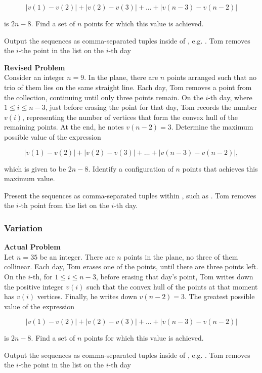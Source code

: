 $$|v(1) - v(2)| + |v(2) - v(3)| + ... + |v(n-3) - v(n-2)|$$

is $2n-8$. Find a set of $n$ points for which this value is achieved.

Output the sequences as comma-separated tuples inside of \boxed, e.g. . Tom removes the $i$-the point in the list on the $i$-th day

\textbf{Revised Problem}\\
Consider an integer $n = 9$. In the plane, there are $n$ points arranged such that no trio of them lies on the same straight line. Each day, Tom removes a point from the collection, continuing until only three points remain. On the $i$-th day, where $1 \leq i \leq n - 3$, just before erasing the point for that day, Tom records the number $v(i)$, representing the number of vertices that form the convex hull of the remaining points. At the end, he notes $v(n-2)=3$. Determine the maximum possible value of the expression

$$|v(1) - v(2)| + |v(2) - v(3)| + \ldots + |v(n-3) - v(n-2)|,$$

which is given to be $2n-8$. Identify a configuration of $n$ points that achieves this maximum value.

Present the sequences as comma-separated tuples within \boxed, such as . Tom removes the $i$-th point from the list on the $i$-th day.

\subsubsection{Variation}
\textbf{Actual Problem}\\
Let $n = 35$ be an integer. There are $n$ points in the plane, no three of them collinear. Each day, Tom erases one of the points, until there are three points left. On the $i$-th, for $1 \leqslant i \leqslant n -3$, before erasing that day's point, Tom writes down the positive integer $v(i)$ such that the convex hull of the points at that moment has $v(i)$ vertices. Finally, he writes down $v(n-2)=3$. The greatest possible value of the expression

$$|v(1) - v(2)| + |v(2) - v(3)| + ... + |v(n-3) - v(n-2)|$$

is $2n-8$. Find a set of $n$ points for which this value is achieved.

Output the sequences as comma-separated tuples inside of \boxed, e.g. . Tom removes the $i$-the point in the list on the $i$-th day

